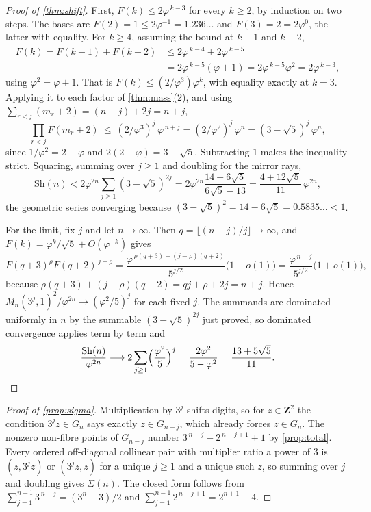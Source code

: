 \documentclass[11pt]{amsart}
\theoremstyle{definition}
\theoremstyle{remark}
\begin{document}
\begin{proof}[Proof of \cref{thm:shift}]
First, $F(k)\le 2\varphi^{\,k-3}$ for every $k\ge 2$, by induction on two steps. The bases are $F(2)=1\le 2\varphi^{-1}=1.236\ldots$ and $F(3)=2=2\varphi^{0}$, the latter with equality. For $k\ge 4$, assuming the bound at $k-1$ and $k-2$,
\[
\begin{aligned}
F(k)=F(k-1)+F(k-2)&\le 2\varphi^{\,k-4}+2\varphi^{\,k-5}\\
&=2\varphi^{\,k-5}(\varphi+1)=2\varphi^{\,k-5}\varphi^2=2\varphi^{\,k-3},
\end{aligned}
\]
using $\varphi^2=\varphi+1$. That is $F(k)\le (2/\varphi^3)\varphi^k$, with equality exactly at $k=3$. Applying it to each factor of \cref{thm:mass}(2), and using $\sum_{r<j}(m_r+2)=(n-j)+2j=n+j$,
\[
\prod_{r<j}F(m_r+2)\ \le\ (2/\varphi^3)^j\,\varphi^{\,n+j}=(2/\varphi^2)^j\,\varphi^n=(3-\sqrt5)^j\,\varphi^n ,
\]
since $1/\varphi^2=2-\varphi$ and $2(2-\varphi)=3-\sqrt5$. Subtracting $1$ makes the inequality strict. Squaring, summing over $j\ge 1$ and doubling for the mirror rays,
\[
\mathrm{Sh}(n)<2\varphi^{2n}\sum_{j\ge 1}(3-\sqrt5)^{2j}=2\varphi^{2n}\frac{14-6\sqrt5}{6\sqrt5-13}=\frac{4+12\sqrt5}{11}\,\varphi^{2n} ,
\]
the geometric series converging because $(3-\sqrt5)^2=14-6\sqrt5=0.5835\ldots<1$.

For the limit, fix $j$ and let $n\to\infty$. Then $q=\lfloor (n-j)/j\rfloor\to\infty$, and $F(k)=\varphi^k/\sqrt5+O(\varphi^{-k})$ gives
\[
F(q+3)^{\rho}F(q+2)^{\,j-\rho}=\frac{\varphi^{\,\rho(q+3)+(j-\rho)(q+2)}}{5^{j/2}}\bigl(1+o(1)\bigr)=\frac{\varphi^{\,n+j}}{5^{j/2}}\bigl(1+o(1)\bigr),
\]
because $\rho(q+3)+(j-\rho)(q+2)=qj+\rho+2j=n+j$. Hence $M_n(3^j,1)^2/\varphi^{2n}\to(\varphi^2/5)^j$ for each fixed $j$. The summands are dominated uniformly in $n$ by the summable $(3-\sqrt5)^{2j}$ just proved, so dominated convergence applies term by term and
\[
\frac{\mathrm{Sh}(n)}{\varphi^{2n}}\longrightarrow 2\sum_{j\ge 1}\Bigl(\frac{\varphi^2}{5}\Bigr)^{j}=\frac{2\varphi^2}{5-\varphi^2}=\frac{13+5\sqrt5}{11}. \qedhere
\]
\end{proof}

\begin{proof}[Proof of \cref{prop:sigma}]
Multiplication by $3^j$ shifts digits, so for $z\in\mathbf{Z}^2$ the condition $3^jz\in G_n$ says exactly $z\in G_{n-j}$, which already forces $z\in G_n$. The nonzero non-fibre points of $G_{n-j}$ number $3^{\,n-j}-2^{\,n-j+1}+1$ by \cref{prop:total}. Every ordered off-diagonal collinear pair with multiplier ratio a power of $3$ is $(z,3^jz)$ or $(3^jz,z)$ for a unique $j\ge 1$ and a unique such $z$, so summing over $j$ and doubling gives $\Sigma(n)$. The closed form follows from $\sum_{j=1}^{n-1}3^{\,n-j}=(3^n-3)/2$ and $\sum_{j=1}^{n-1}2^{\,n-j+1}=2^{n+1}-4$.
\end{proof}
\end{document}
